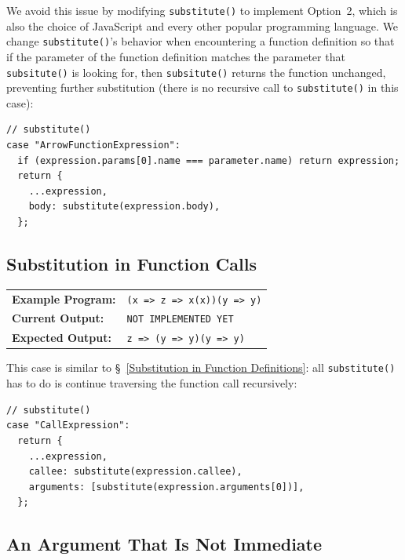 \documentclass[12pt, oneside]{book}
\begin{document}
We avoid this issue by modifying \texttt{substitute()} to implement Option~2, which is also the choice of JavaScript and every other popular programming language. We change \texttt{substitute()}’s behavior when encountering a function definition so that if the parameter of the function definition matches the parameter that \texttt{subsitute()} is looking for, then \texttt{subsitute()} returns the function unchanged, preventing further substitution (there is no recursive call to \texttt{substitute()} in this case):

\begin{verbatim}
// substitute()
case "ArrowFunctionExpression":
  if (expression.params[0].name === parameter.name) return expression;
  return {
    ...expression,
    body: substitute(expression.body),
  };
\end{verbatim}

\subsection{Substitution in Function Calls}
\label{Substitution in Function Calls}

\begin{center}
\begin{tabular}{ll}
\textbf{Example Program:} & \texttt{(x => z => x(x))(y => y)} \\
\textbf{Current Output:} & \texttt{NOT IMPLEMENTED YET} \\
\textbf{Expected Output:} & \texttt{z => (y => y)(y => y)} \\
\end{tabular}
\end{center}

This case is similar to §~\ref{Substitution in Function Definitions}: all \texttt{substitute()} has to do is continue traversing the function call recursively:

\begin{verbatim}
// substitute()
case "CallExpression":
  return {
    ...expression,
    callee: substitute(expression.callee),
    arguments: [substitute(expression.arguments[0])],
  };
\end{verbatim}

\subsection{An Argument That Is Not Immediate}
\label{An Argument That Is Not Immediate}
\end{document}
